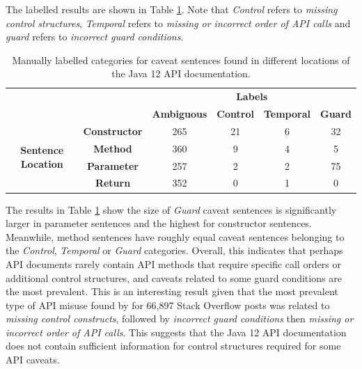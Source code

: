 The labelled results are shown in Table \ref{tab:caveat-sent-stats}. Note that \textit{Control} refers to \textit{missing control structures}, \textit{Temporal} refers to \textit{missing or incorrect order of API calls} and \textit{guard} refers to \textit{incorrect guard conditions}.\\

\begin{table}[h]
	\begin{tabular}{|cc|cccc|}
		\hline
		&  & \multicolumn{4}{c|}{\textbf{Labels}} \\ \cline{3-6} 
		&  & \textbf{Ambiguous} & \textbf{Control} & \textbf{Temporal} & \textbf{Guard} \\ \hline
		\multicolumn{1}{|c|}{\multirow{4}{*}{\textbf{Sentence Location}}} & \textbf{Constructor} & 265 & 21 & 6 & 32 \\ \cline{2-6} 
		\multicolumn{1}{|c|}{} & \textbf{Method} & 360 & 9 & 4 & 5 \\ \cline{2-6} 
		\multicolumn{1}{|c|}{} & \textbf{Parameter} & 257 & 2 & 2 & 75 \\ \cline{2-6} 
		\multicolumn{1}{|c|}{} & \textbf{Return} & 352 & 0 & 1 & 0 \\ \hline
	\end{tabular}
	\caption{Manually labelled categories for caveat sentences found in different locations of the Java 12 API documentation.}
	\label{tab:caveat-sent-stats}
\end{table}

The results in Table \ref{tab:caveat-sent-stats} show the size of \textit{Guard} caveat sentences is significantly larger in parameter sentences and the highest for constructor sentences. Meanwhile, method sentences have roughly equal caveat sentences belonging to the \textit{Control}, \textit{Temporal} or \textit{Guard} categories. Overall, this indicates that perhaps API documents rarely contain API methods that require specific call orders or additional control structures, and caveats related to some guard conditions are the most prevalent. This is an interesting result given that the most prevalent type of API misuse found by \cite{code-examples} for 66,897 Stack Overflow posts was related to \textit{missing control constructs}, followed by \textit{incorrect guard conditions} then \textit{missing or incorrect order of API calls}. This  suggests that the Java 12 API documentation does not contain sufficient information for control structures required for some API caveats.

